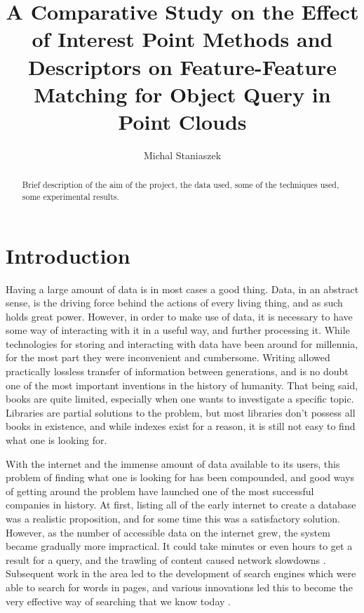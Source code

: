 \documentclass[11pt,a4paper]{kth-mag}
\author{Michal Staniaszek}
\title{A Comparative Study on the Effect of Interest Point Methods and
  Descriptors on Feature-Feature Matching for Object Query in Point Clouds}
\begin{document}
\maketitle
\begin{abstract}
  Brief description of the aim of the project, the data used, some of the
  techniques used, some experimental results.
\end{abstract}
\tableofcontents
\chapter{Introduction}
Having a large amount of data is in most cases a good thing. Data, in an
abstract sense, is the driving force behind the actions of every living thing,
and as such holds great power. However, in order to make use of data, it is
necessary to have some way of interacting with it in a useful way, and further
processing it. While technologies for storing and interacting with data have
been around for millennia, for the most part they were inconvenient and
cumbersome. Writing allowed practically lossless transfer of information between
generations, and is no doubt one of the most important inventions in the history
of humanity. That being said, books are quite limited, especially when one wants
to investigate a specific topic. Libraries are partial solutions to the problem,
but most libraries don't possess all books in existence, and while indexes exist
for a reason, it is still not easy to find what one is looking for.

With the internet and the immense amount of data available to its users, this
problem of finding what one is looking for has been compounded, and good ways of
getting around the problem have launched one of the most successful companies in
history. At first, listing all of the early internet to create a database was a
realistic proposition, and for some time this was a satisfactory solution.
However, as the number of accessible data on the internet grew, the system
became gradually more impractical. It could take minutes or even hours to get a
result for a query, and the trawling of content caused network slowdowns
\cite{firstsearch,archieabout,bowman1993research}. Subsequent work in the area
led to the development of search engines which were able to search for words in
pages, and various innovations led this to become the very effective way of
searching that we know today \cite{brin1998anatomy,pinkerton1994finding}.
\end{document}
